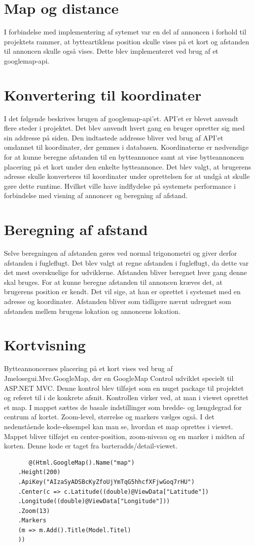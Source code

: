 \section{Map og distance}
I forbindelse med implementering af sytemet var en del af annoncen i forhold til projektets rammer, at bytteartiklens position skulle vises på et kort og afstanden til annoncen skulle også vises. Dette blev implementeret ved brug af et googlemap-api.
\section{Konvertering til koordinater}
I det følgende beskrives brugen af googlemap-api'et. API'et er blevet anvendt flere steder i projektet. Det blev anvendt hvert gang en bruger opretter sig med sin addresse på siden. Den indtastede addresse bliver ved brug af API'et omdannet til koordinater, der gemmes i databasen. Koordinaterne er nødvendige for at kunne beregne afstanden til en bytteannonce samt at vise bytteannoncen placering på et kort under den enkelte bytteannonce.
Det blev valgt, at brugerens adresse skulle konverteres til koordinater under oprettelsen for at undgå at skulle gøre dette runtime. Hvilket ville have indflydelse på systemets performance i forbindelse med visning af annoncer og beregning af afstand.

\section{Beregning af afstand}
Selve beregningen af afstanden gøres ved normal trigonometri og giver derfor afstanden i fugleflugt. Det blev valgt at regne afstanden i fugleflugt, da dette var det mest overskuelige for udviklerne. Afstanden bliver beregnet hver gang denne skal bruges. For at kunne beregne afstanden til annoncen kræves det, at brugerens position er kendt. Det vil sige, at han er oprettet i systemet med en adresse og koordinater. Afstanden bliver som tidligere nævnt udregnet som afstanden mellem brugens lokation og annoncens lokation.

\section{Kortvisning}
Bytteannoncernes placering på et kort vises ved brug af Jmelosegui.Mvc.GoogleMap, der en GoogleMap Control udviklet specielt til ASP.NET MVC. Denne kontrol blev tilføjet som en nuget package til projektet og referet til i de konkrete afsnit. Kontrollen virker ved, at man i viewet oprettet et map. I mappet sættes de basale indstillinger som bredde- og længdegrad for centrum af kortet. Zoom-level, størrelse og markers vælges også.
I det nedenstående kode-eksempel kan man se, hvordan et map oprettes i viewet. Mappet bliver tilføjet en center-position, zoom-niveau og en marker i midten af korten. Denne kode er taget fra barteradds/detail-viewet.
\begin{verbatim}
	   @(Html.GoogleMap().Name("map")
	.Height(200)
	.ApiKey("AIzaSyADSBcKyZfoUjYmTqG5hhcfXFjwGoq7rHU")
	.Center(c => c.Latitude((double)@ViewData["Latitude"])
	.Longitude((double)@ViewData["Longitude"]))
	.Zoom(13)
	.Markers
	(m => m.Add().Title(Model.Titel)
	))
\end{verbatim}

